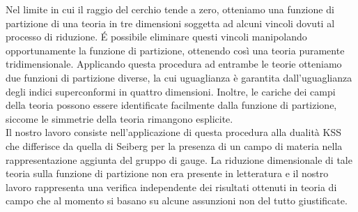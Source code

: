\documentclass[a4paper,12pt]{article}
\begin{document}
Nel limite in cui il raggio del cerchio tende a zero, otteniamo una funzione di partizione di una teoria in tre dimensioni soggetta ad alcuni vincoli dovuti al processo di riduzione.
\'E possibile eliminare questi vincoli manipolando opportunamente la funzione di partizione, ottenendo così una teoria puramente tridimensionale. 
Applicando questa procedura ad entrambe le teorie otteniamo due funzioni di partizione diverse, la cui uguaglianza è garantita dall'uguaglianza degli indici superconformi in quattro dimensioni.
Inoltre, le cariche dei campi della teoria possono essere identificate facilmente dalla funzione di partizione, siccome le simmetrie della teoria rimangono esplicite.
\\
Il nostro lavoro consiste nell'applicazione di questa procedura alla dualità KSS che differisce da quella di Seiberg per la presenza di un campo di materia nella rappresentazione aggiunta del gruppo di gauge. 
La riduzione dimensionale di tale teoria  sulla funzione di partizione non era presente in letteratura e il nostro lavoro rappresenta una verifica independente dei risultati ottenuti in teoria di campo che al momento si basano su alcune assunzioni non del tutto giustificate.
\end{document}
